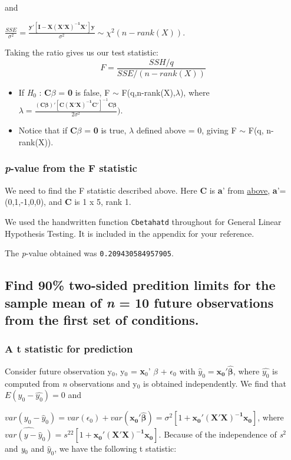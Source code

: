 \documentclass[11pt]{article}
\begin{document}
\noindent and

\(\frac{SSE}{\sigma^2} = \frac{\mathbf{y}'[\mathbf{I} -
\mathbf{X(X'X)^{-1}X}']\mathbf{y}}{\sigma^2} \sim \chi^2(n-rank(X)).\)

Taking the ratio gives us our test statistic:
$$F = \frac{SSH/q}{SSE/(n-rank(X))}$$

\begin{itemize}
\item If \emph{H$_0$} : \textbf{C$\beta$} = \textbf{0} is false, F $\sim$ F(q,n-rank(X),$\lambda$), where
  $\lambda =
  \frac{(\mathbf{C\beta})'[\mathbf{C(X'X)^{-1}C}']^{-1}\mathbf{C\beta}}{2\sigma^2})$.
\item Notice that if \textbf{C$\beta$} = \textbf{0} is true, $\lambda$ defined above = 0, giving F
  $\sim$ F(q, n-rank(X)).
\end{itemize}
\subsubsection{\emph{p}-value from the F statistic}
\label{sec-1-4-2}


We need to find the F statistic described above. Here \textbf{C} is \textbf{a}' from
\hyperref[Tau1Tau2]{above}, \textbf{a}'=(0,1,-1,0,0), and \textbf{C} is 1 x 5, rank 1.

We used the handwritten function \verb~Cbetahatd~ throughout for
General Linear Hypothesis Testing. It is included in the appendix for
your reference.

The \emph{p}-value obtained was \texttt{0.209430584957905}. 
\subsection{Find 90\% two-sided predition limits for the sample mean of \emph{n} = 10 future observations from the first set of conditions.}
\label{sec-1-5}
\subsubsection{A t statistic for prediction}
\label{sec-1-5-1}


Consider future observation y$_0$, y$_0$ = \textbf{x$_0$}' $\beta$ + $\epsilon$$_0$ with
$\hat{y}_0 = \mathbf{x_0'\hat{\beta}}$, where $\hat{y_0}$ is computed
from \emph{n} observations and y$_0$ is obtained independently. We find that
$E(y_0 - \hat{y_0}) = 0$ and 


$var(y_0 - \hat{y}_0) = var(\epsilon_0) +
var(\mathbf{x_0'\hat{\beta}}) = \sigma^2[1+
\mathbf{x_0'(X'X)^{-1}x_0}]$, where 
$\widehat{var(y - \hat{y}_0)} = s^22[1+ \mathbf{x_0'(X'X)^{-1}x_0}]$. Because of the independence of \emph{s$^2$}
and \emph{y$_0$} and $\hat{y}_0$, we have the following t statistic:
\end{document}
